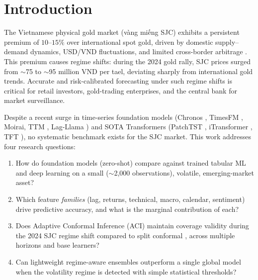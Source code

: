 \documentclass[conference]{IEEEtran}
\begin{document}
\section{Introduction}

The Vietnamese physical gold market (vàng miếng SJC) exhibits a persistent premium of $10$--$15\%$ over international spot gold, driven by domestic supply--demand dynamics, USD/VND fluctuations, and limited cross-border arbitrage \cite{bouteska2023}. This premium causes regime shifts: during the 2024 gold rally, SJC prices surged from $\sim$75 to $\sim$95 million VND per tael, deviating sharply from international gold trends. Accurate and risk-calibrated forecasting under such regime shifts is critical for retail investors, gold-trading enterprises, and the central bank for market surveillance.

Despite a recent surge in time-series foundation models (Chronos \cite{ansari2024chronos}, TimesFM \cite{das2024timesfm}, Moirai, TTM \cite{ekambaram2024ttm}, Lag-Llama \cite{rasul2024laglama}) and SOTA Transformers (PatchTST \cite{nie2023patchtst}, iTransformer \cite{liu2024itransformer}, TFT \cite{lim2021tft}), no systematic benchmark exists for the SJC market. This work addresses four research questions:

\begin{enumerate}
\item How do foundation models (zero-shot) compare against trained tabular ML and deep learning on a small ($\sim$2{,}000 observations), volatile, emerging-market asset?
\item Which feature \emph{families} (lag, returns, technical, macro, calendar, sentiment) drive predictive accuracy, and what is the marginal contribution of each?
\item Does Adaptive Conformal Inference (ACI) \cite{gibbs2021aci} maintain coverage validity during the 2024 SJC regime shift compared to split conformal \cite{vovk2005}, across multiple horizons and base learners?
\item Can lightweight regime-aware ensembles outperform a single global model when the volatility regime is detected with simple statistical thresholds?
\end{enumerate}
\end{document}
